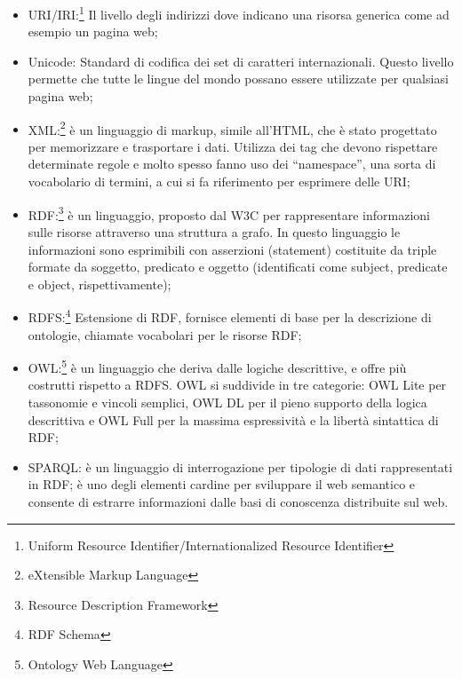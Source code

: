 \documentclass[a4paper,11pt]{article}
\begin{document}
\begin{itemize}	
	\item URI/IRI:\footnote{Uniform Resource Identifier/Internationalized Resource Identifier} Il livello degli indirizzi dove indicano una risorsa generica come ad esempio un pagina web;
	\item Unicode: Standard di codifica dei set di caratteri internazionali. Questo livello permette che tutte le lingue del mondo possano essere utilizzate per qualsiasi pagina web;
	\item XML:\footnote{eXtensible Markup Language} è un linguaggio di markup, simile all'HTML, che è stato progettato per memorizzare e trasportare i dati. Utilizza dei tag che devono rispettare determinate regole e molto spesso fanno uso dei “namespace”, una sorta di vocabolario di termini, a cui si fa riferimento per esprimere delle URI;
	\item RDF:\footnote{Resource Description Framework} è un linguaggio, proposto dal W3C per rappresentare informazioni sulle risorse attraverso una struttura a grafo. In questo linguaggio le informazioni sono esprimibili con asserzioni (statement) costituite da triple formate da soggetto, predicato e oggetto (identificati come subject, predicate e object, rispettivamente);
	\item RDFS:\footnote{RDF Schema} Estensione di RDF, fornisce elementi di base per la descrizione di ontologie, chiamate vocabolari per le risorse RDF;
	\item OWL:\footnote{Ontology Web Language} è un linguaggio che deriva dalle logiche descrittive, e offre più costrutti rispetto a RDFS. OWL si suddivide in tre categorie: OWL Lite per tassonomie e vincoli semplici, OWL DL per il pieno supporto della logica descrittiva e OWL Full per la massima espressività e la libertà sintattica di RDF;
	\item SPARQL: è un linguaggio di interrogazione per tipologie di dati rappresentati in RDF; è uno degli elementi cardine per sviluppare il web semantico e consente di estrarre informazioni dalle basi di conoscenza distribuite sul web.
\end{itemize}
\end{document}
